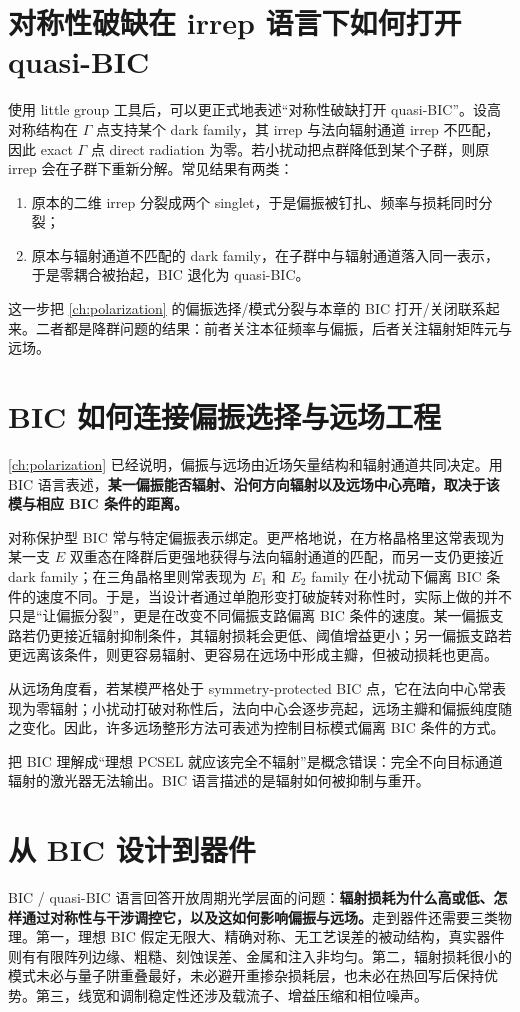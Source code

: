 \section{对称性破缺在 irrep 语言下如何打开 quasi-BIC}
使用 little group 工具后，可以更正式地表述“对称性破缺打开 quasi-BIC”。设高对称结构在 $\Gamma$ 点支持某个 dark family，其 irrep 与法向辐射通道 irrep 不匹配，因此 exact $\Gamma$ 点 direct radiation 为零。若小扰动把点群降低到某个子群，则原 irrep 会在子群下重新分解。常见结果有两类：
\begin{enumerate}
  \item 原本的二维 irrep 分裂成两个 singlet，于是偏振被钉扎、频率与损耗同时分裂；
  \item 原本与辐射通道不匹配的 dark family，在子群中与辐射通道落入同一表示，于是零耦合被抬起，BIC 退化为 quasi-BIC。
\end{enumerate}
这一步把 \cref{ch:polarization} 的偏振选择/模式分裂与本章的 BIC 打开/关闭联系起来。二者都是降群问题的结果：前者关注本征频率与偏振，后者关注辐射矩阵元与远场。

\section{BIC 如何连接偏振选择与远场工程}
\cref{ch:polarization} 已经说明，偏振与远场由近场矢量结构和辐射通道共同决定。用 BIC 语言表述，\textbf{某一偏振能否辐射、沿何方向辐射以及远场中心亮暗，取决于该模与相应 BIC 条件的距离。}

对称保护型 BIC 常与特定偏振表示绑定。更严格地说，在方格晶格里这常表现为某一支 $E$ 双重态在降群后更强地获得与法向辐射通道的匹配，而另一支仍更接近 dark family；在三角晶格里则常表现为 $E_1$ 和 $E_2$ family 在小扰动下偏离 BIC 条件的速度不同。于是，当设计者通过单胞形变打破旋转对称性时，实际上做的并不只是“让偏振分裂”，更是在改变不同偏振支路偏离 BIC 条件的速度。某一偏振支路若仍更接近辐射抑制条件，其辐射损耗会更低、阈值增益更小；另一偏振支路若更远离该条件，则更容易辐射、更容易在远场中形成主瓣，但被动损耗也更高。

从远场角度看，若某模严格处于 symmetry-protected BIC 点，它在法向中心常表现为零辐射；小扰动打破对称性后，法向中心会逐步亮起，远场主瓣和偏振纯度随之变化。因此，许多远场整形方法可表述为控制目标模式偏离 BIC 条件的方式。

把 BIC 理解成“理想 PCSEL 就应该完全不辐射”是概念错误：完全不向目标通道辐射的激光器无法输出。BIC 语言描述的是辐射如何被抑制与重开。

\section{从 BIC 设计到器件}
BIC / quasi-BIC 语言回答开放周期光学层面的问题：\textbf{辐射损耗为什么高或低、怎样通过对称性与干涉调控它，以及这如何影响偏振与远场。}走到器件还需要三类物理。第一，理想 BIC 假定无限大、精确对称、无工艺误差的被动结构，真实器件则有有限阵列边缘、粗糙、刻蚀误差、金属和注入非均匀。第二，辐射损耗很小的模式未必与量子阱重叠最好，未必避开重掺杂损耗层，也未必在热回写后保持优势。第三，线宽和调制稳定性还涉及载流子、增益压缩和相位噪声。

